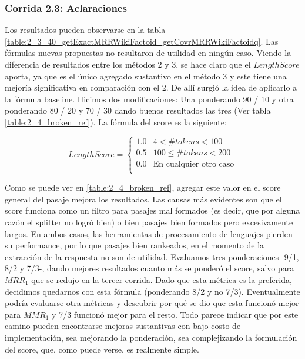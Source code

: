 \begin{frame}
\frametitle{Corrida 2.3: Aclaraciones}
Los resultados pueden observarse en la tabla \ref{table:2_3_40_getExactMRRWikiFactoid_getCovrMRRWikiFactoidq}. Las fórmulas nuevas propuestas no resultaron de utilidad en ningún caso. Viendo la diferencia de resultados entre los métodos 2 y 3, se hace claro que el $LengthScore$ aporta, ya que es el único agregado sustantivo en el método 3 y este tiene una mejoría significativa en comparación con el 2. De allí surgió la idea de aplicarlo a la fórmula baseline.
Hicimos dos modificaciones: Una ponderando 90 / 10 y otra ponderando 80 / 20 y 70 / 30 dando buenos resultados las tres (Ver tabla \ref{table:2_4_broken_ref}).
La fórmula del score es la siguiente:

\begin{equation*}
    LengthScore = \begin{cases}
               1.0     & 4 <   \#tokens < 100\\
               0.5     & 100 \leq \#tokens < 200 \\
               0.0     & \text{En cualquier otro caso}\\
           \end{cases}
\end{equation*}


Como se puede ver en \ref{table:2_4_broken_ref}, agregar este valor en el score general del pasaje mejora los resultados. Las causas más evidentes son que el score funciona como un filtro para pasajes mal formados (es decir, que por alguna razón el splitter no logró  bien) o bien pasajes bien formados pero excesivamente largos. En ambos casos, las herramientas de procesamiento de lenguajes pierden su performance, por lo que pasajes bien rankeados, en el momento de la extracción de la respuesta no son de utilidad. Evaluamos tres ponderaciones -9/1, 8/2 y 7/3-, dando mejores resultados cuanto más se ponderó el score, salvo para $MRR_1$ que se redujo en la tercer corrida. Dado que esta métrica es la preferida, decidimos quedarnos con esta fórmula (ponderando 8/2 y no 7/3). Eventualmente podría evaluarse otra métricas y descubrir por qué se dio que esta funcionó mejor para $MMR_1$ y 7/3 funcionó mejor para el resto. Todo parece indicar que por este camino pueden encontrarse mejoras sustantivas con bajo costo de implementación, sea mejorando la ponderación, sea complejizando la formulación del score, que, como puede verse, es realmente simple.

\end{frame}

